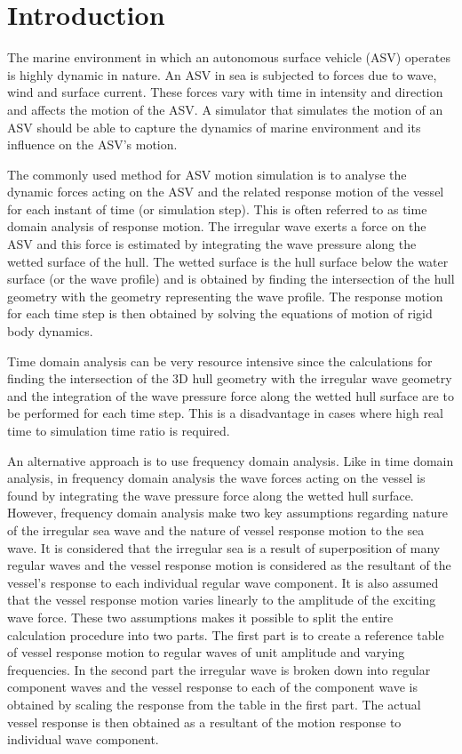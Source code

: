 \section{Introduction} 

The marine environment in which an autonomous surface vehicle (ASV) operates is
highly dynamic in nature. An ASV in sea is subjected to forces due to wave, wind
and surface current. These forces vary with time in intensity and direction and
affects the motion of the ASV. A simulator that simulates the motion of an ASV
should be able to capture the dynamics of marine environment and its influence
on the ASV's motion.

The commonly used method for ASV motion simulation is to analyse the dynamic
forces acting on the ASV and the related response motion of the vessel for each
instant of time (or simulation step). This is often referred to as time domain
analysis of response motion. The irregular wave exerts a force on the ASV and
this force is estimated by integrating the wave pressure along the wetted
surface of the hull.  The wetted surface is the hull surface below the water
surface (or the wave profile) and is obtained by finding the intersection of the
hull geometry with the geometry representing the wave profile. The response
motion for each time step is then obtained by solving the equations of motion of
rigid body dynamics. 

Time domain analysis can be very resource intensive since the calculations for
finding the intersection of the 3D hull geometry with the irregular wave
geometry and the integration of the wave pressure force along the wetted hull
surface are to be performed for each time step. This is a disadvantage in cases
where high real time to simulation time ratio is required.

An alternative approach is to use frequency domain analysis. Like in time domain
analysis, in frequency domain analysis the wave forces acting on the vessel is
found by integrating the wave pressure force along the wetted hull surface.
However, frequency domain analysis make two key assumptions regarding nature of
the irregular sea wave and the nature of vessel response motion to the sea wave.
It is considered that the irregular sea is a result of superposition of many
regular waves and the vessel response motion is considered as the resultant of
the vessel's response to each individual regular wave component. It is also
assumed that the vessel response motion varies linearly to the amplitude of the
exciting wave force. These two assumptions makes it possible to split the entire
calculation procedure into two parts. The first part is to create a reference
table of vessel response motion to regular waves of unit amplitude and varying
frequencies. In the second part the irregular wave is broken down into regular
component waves and the vessel response to each of the component wave is
obtained by scaling the response from the table in the first part. The actual
vessel response is then obtained as a resultant of the motion response to
individual wave component.

